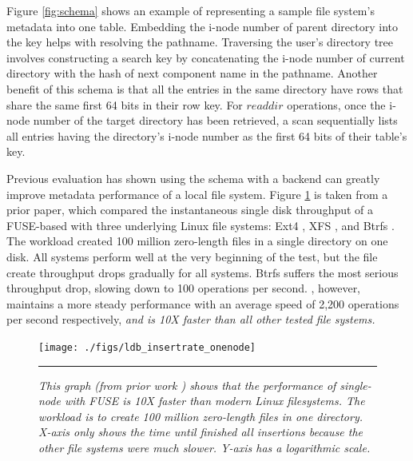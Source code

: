 Figure \ref{fig:schema} shows an example of representing
a sample file system's metadata into one table.
Embedding the i-node number of parent directory into the key
helps with resolving the pathname.
Traversing the user's directory tree
involves constructing a search key by concatenating the i-node
number of current directory with the hash of
next component name in the pathname.
Another benefit of this schema is that all the entries
in the same directory have rows that
share the same first 64 bits in their row key.
For $readdir$ operations, once the i-node number
of the target directory has been retrieved,
a scan sequentially lists all entries having
the directory's i-node number as the first 64 bits of their table's key.

Previous evaluation \cite{TableFS} has shown using
the \tfs schema with a \ldb backend
can greatly improve metadata performance of a local file system.
Figure \ref{graph:ldb-singlenode} is taken from a prior \tfs paper,
which compared the instantaneous single disk throughput of a FUSE-based \tfs
with three underlying Linux file systems: Ext4 \cite{Ext4}, XFS \cite{XFS}, and
Btrfs \cite{BTRFS}.
The workload created 100 million zero-length files in a single directory
on one disk.
All systems perform well at the very beginning of the test, but the file create
throughput drops gradually for all systems.
Btrfs suffers the most serious throughput drop, slowing down to 100 operations
per second.
\tfs, however, maintains a more steady performance
with an average speed of 2,200 operations per second respectively,
\textit{and is 10X faster than all other tested file systems.}

\begin{figure}[t]  %
\centerline{\texttt{[image: ./figs/ldb\_insertrate\_onenode]}}
\vspace{10pt}
\caption{\textit{\footnotesize
This graph (from prior work \cite{TableFS}) shows
that the performance of single-node \tfs with FUSE is 10X faster than modern Linux
filesystems. The workload is to create 100 million zero-length files in one directory.
X-axis only shows the time until \tfs finished all insertions because the other
file systems were much slower. Y-axis has a logarithmic scale.}
}
\hrule 
\label{graph:ldb-singlenode}
\end{figure}       %
